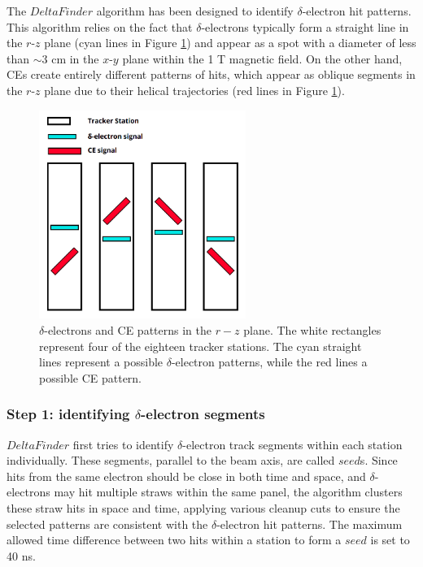 The $DeltaFinder$ algorithm has been designed 
to identify $\delta$-electron hit patterns. This 
algorithm relies on the 
fact that $\delta$-electrons typically 
form a straight line in 
the $r$-$z$ plane (cyan lines in Figure 
\ref{fig:yzviewdelta}) 
and appear as a spot with a diameter 
of less than $\sim$3 cm in the 
$x$-$y$ plane within the 1 T  
magnetic field. On the other hand, 
CEs create entirely different 
patterns of hits, which appear as oblique segments in 
the $r$-$z$ plane due to their 
helical trajectories (red lines 
in Figure \ref{fig:yzviewdelta}). 
\begin{figure}[!h]
    \centering
    \includegraphics[width =0.6\textwidth]{figures/png/Screenshot_20240811_123048.png}
    \caption[$\delta$-electrons and CE patterns in $r-z$ plane.]{
        $\delta$-electrons and CE patterns in the $r-z$ plane. 
        The white rectangles represent four of the eighteen tracker stations. 
        The cyan straight lines represent a possible $\delta$-electron 
        patterns, while the red lines a possible CE pattern.
        }
    \label{fig:yzviewdelta}
\end{figure}
\subsubsection{Step 1: identifying $\delta$-electron segments}
$DeltaFinder$ first tries to 
identify $\delta$-electron track 
segments within each station 
individually. These segments, 
parallel to the beam axis, are 
called $seed$s. Since hits 
from the same electron should be 
close in both time and space, 
and $\delta$-electrons may hit 
multiple straws within the 
same panel, the algorithm clusters 
these straw hits in space and time, applying various 
cleanup cuts to ensure the 
selected patterns are consistent with the 
$\delta$-electron hit patterns. 
The maximum allowed time 
difference between two hits within 
a station to form a $seed$ is set to 40 ns.

